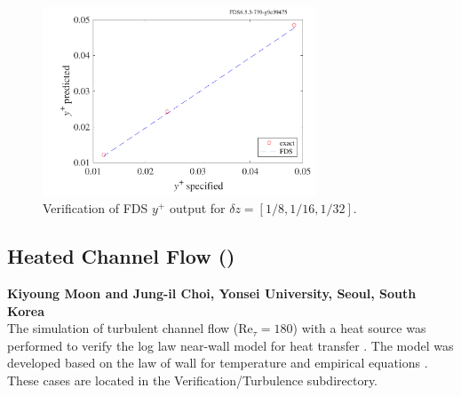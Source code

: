 \documentclass[11pt]{book}
\begin{document}
\begin{figure}[h!]
\begin{center}
   \includegraphics[width=3.2in]{SCRIPT_FIGURES/yplus}
   \caption[Near-wall grid resolution]{Verification of FDS $y^+$ output for $\delta z=[1/8, 1/16, 1/32]$.}
   \label{fig_yplus}
\end{center}
\end{figure}

\clearpage

\subsection{Heated Channel Flow (\texorpdfstring{}{heated\_channel})}

\textbf{Kiyoung Moon and Jung-il Choi, Yonsei University, Seoul, South Korea}\\

\noindent The simulation of turbulent channel flow (Re$_{\tau}=180$) with a heat source was performed to verify the log law near-wall model for heat transfer \cite{FDS_Tech_Guide}. The model was developed based on the law of wall for temperature and empirical equations \cite{Kader:1981}. These cases are located in the Verification/Turbulence subdirectory.
\end{document}
